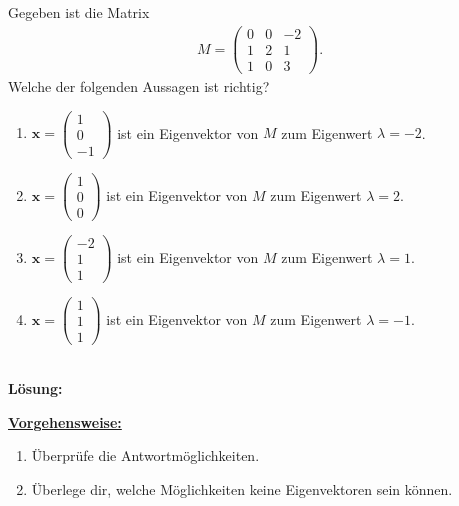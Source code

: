 \subsection*{}
Gegeben ist die Matrix
\begin{align*}
M
=
\begin{pmatrix}
0 & 0 & -2\\
1 & 2 & 1\\
1 & 0 & 3
\end{pmatrix}.
\end{align*}
Welche der folgenden Aussagen ist richtig?
\renewcommand{\labelenumi}{(\alph{enumi})}
\begin{enumerate}
	\item 
	$ \textbf{x} = \begin{pmatrix}
	1 \\ 0 \\ -1
	\end{pmatrix} $ ist ein Eigenvektor von $ M $ zum Eigenwert $ \lambda = -2 $.
	\item
	$ \textbf{x} = \begin{pmatrix}
	1 \\ 0 \\ 0
	\end{pmatrix} $ ist ein Eigenvektor von $ M $ zum Eigenwert $ \lambda = 2 $.
	\item
	$ \textbf{x} = \begin{pmatrix}
	-2 \\ 1 \\ 1
	\end{pmatrix} $ ist ein Eigenvektor von $ M $ zum Eigenwert $ \lambda = 1 $.
	\item
	$ \textbf{x} = \begin{pmatrix}
	1 \\ 1 \\ 1
	\end{pmatrix} $ ist ein Eigenvektor von $ M $ zum Eigenwert $ \lambda = -1 $.
\end{enumerate}
\ \\
\textbf{Lösung:}
\begin{mdframed}
\underline{\textbf{Vorgehensweise:}}
\renewcommand{\labelenumi}{\theenumi.}
\begin{enumerate}
\item Überprüfe die Antwortmöglichkeiten.
\item Überlege dir, welche Möglichkeiten keine Eigenvektoren sein können.
\end{enumerate}
\end{mdframed}

